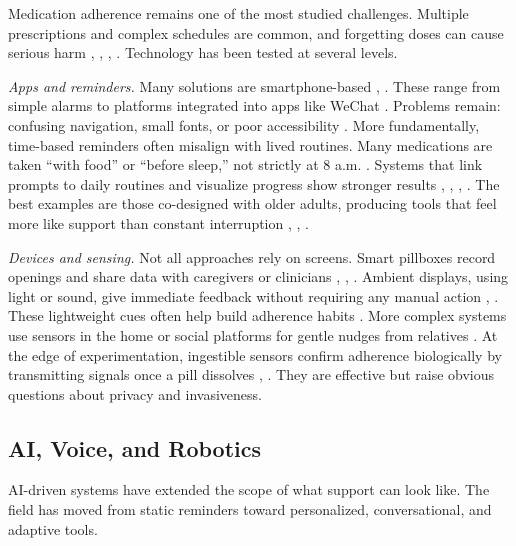 \documentclass[acmlarge]{acmart}
\begin{document}
Medication adherence remains one of the most studied challenges.
Multiple prescriptions and complex schedules are common, and forgetting
doses can cause serious harm \cite{10.1145/3154862.3154883}, \cite{doi:10.1177/2333721419845179}, \cite{10.1145/3636534.3698116}, \cite{Bastani01122021}. Technology has been
tested at several levels.

\emph{Apps and reminders.} Many solutions are smartphone-based \cite{10.1007/978-3-642-02774-1_77},
\cite{10.1145/2556288.2557079}. These range from simple alarms to platforms integrated into apps
like WeChat \cite{10.1145/3630138.3630553}. Problems remain: confusing navigation, small
fonts, or poor accessibility \cite{doi:10.1177/1541931213601769}. More fundamentally, time-based
reminders often misalign with lived routines. Many medications are taken
``with food'' or ``before sleep,'' not strictly at 8 a.m. \cite{10.1145/3636534.3698116}.
Systems that link prompts to daily routines and visualize progress show
stronger results \cite{10.1007/s00779-020-01420-4}, \cite{NIE2024100076}, \cite{10.1145/2556288.2557079}, \cite{10.1145/3462676.3462684}. The best examples are those
co-designed with older adults, producing tools that feel more like
support than constant interruption \cite{10.1145/2491148.2491155}, \cite{FERREIRA2014398}, \cite{Nguyen2023-ku}.

\emph{Devices and sensing.} Not all approaches rely on screens. Smart
pillboxes record openings and share data with caregivers or clinicians
\cite{doi:10.1177/2333721419845179}, \cite{Paul2024-jk}, \cite{TURJAMAA2020677}. Ambient displays, using light or sound, give immediate
feedback without requiring any manual action \cite{info:doi/10.2196/14680}, \cite{10.1145/2556288.2557210}. These
lightweight cues often help build adherence habits \cite{10.1145/2556288.2557210}. More
complex systems use sensors in the home or social platforms for gentle
nudges from relatives \cite{10.1016/j.comcom.2015.04.001}. At the edge of experimentation,
ingestible sensors confirm adherence biologically by transmitting
signals once a pill dissolves \cite{10.1145/2769493.2769570}, \cite{10.1145/3290605.3300806 }. They are effective but raise
obvious questions about privacy and invasiveness.

\subsection{AI, Voice, and Robotics}
AI-driven systems have extended the scope of what support can look like.
The field has moved from static reminders toward personalized,
conversational, and adaptive tools.
\end{document}
